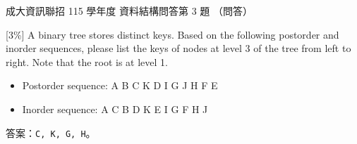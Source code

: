 \begin{pastexam}[label={px:ncku-115-prog-02}]{成大資訊聯招 115 學年度 資料結構問答第 3 題}
（問答）

[3\%] A binary tree stores distinct keys. Based on the following postorder and inorder sequences, please
list the keys of nodes at level 3 of the tree from left to right. Note that the root is at level 1.
\begin{itemize}
\item Postorder sequence: A B C K D I G J H F E
\item Inorder sequence: A C B D K E I G F H J
\end{itemize}
\end{pastexam}

\begin{pastsoln}
答案：\texttt{C, K, G, H}。


\end{pastsoln}
